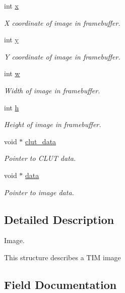 \begin{DoxyCompactItemize}
int \hyperlink{structGsImage_a7f481bb2d04e6d2fcab28a70740a087b}{x}
\begin{DoxyCompactList}\small\item\em X coordinate of image in framebuffer. \end{DoxyCompactList}\item 
int \hyperlink{structGsImage_abe372808a69fc03db2f832375a28f421}{y}
\begin{DoxyCompactList}\small\item\em Y coordinate of image in framebuffer. \end{DoxyCompactList}\item 
int \hyperlink{structGsImage_a9161db2be29ff2caf39a9b8fea7256fc}{w}
\begin{DoxyCompactList}\small\item\em Width of image in framebuffer. \end{DoxyCompactList}\item 
int \hyperlink{structGsImage_a833613285c334d6e02dab93a6851ea9e}{h}
\begin{DoxyCompactList}\small\item\em Height of image in framebuffer. \end{DoxyCompactList}\item 
void $\ast$ \hyperlink{structGsImage_a70b2875be1afa7d9b815004c1eea263f}{clut\+\_\+data}
\begin{DoxyCompactList}\small\item\em Pointer to C\+L\+UT data. \end{DoxyCompactList}\item 
void $\ast$ \hyperlink{structGsImage_a911f9bc144bfeb7a1f7a4a761f8107c0}{data}
\begin{DoxyCompactList}\small\item\em Pointer to image data. \end{DoxyCompactList}\end{DoxyCompactItemize}


\subsection{Detailed Description}
Image. 

This structure describes a T\+IM image 

\subsection{Field Documentation}
\mbox{\label{structGsImage_a70b2875be1afa7d9b815004c1eea263f}} 
